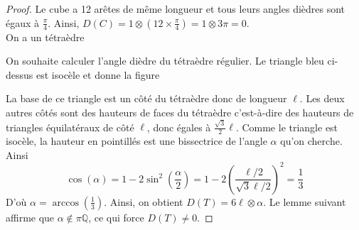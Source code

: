 \documentclass{article}
\newcommand{\Q}{\mathbb{Q}}
\theoremstyle{plain}
\theoremstyle{definition}
\theoremstyle{remark}
\begin{document}
\begin{proof}
    Le cube a 12 arêtes de même longueur et tous leurs angles dièdres sont égaux à $\frac{\pi}{4}$. Ainsi, $D(C) = 1 \otimes (12 \times \frac{\pi}{4}) = 1 \otimes 3 \pi = 0$. \\
    On a un tétraèdre
    \begin{center}
    \end{center}
    On souhaite calculer l'angle dièdre du tétraèdre régulier. Le triangle bleu ci-dessus est isocèle et donne la figure
    \begin{center}
    \end{center}
    La base de ce triangle est un côté du tétraèdre donc de longueur $\ell$. Les deux autres côtés sont des hauteurs de faces du tétraèdre c'est-à-dire des hauteurs de triangles équilatéraux de côté $\ell$, donc égales à $\frac{\sqrt{3}}{2} \ell$. Comme le triangle est isocèle, la hauteur en pointillés est une bissectrice de l'angle $\alpha$ qu'on cherche. Ainsi
    \[\cos(\alpha) = 1 - 2\sin^2\left(\frac{\alpha}{2}\right) = 1 - 2 \left(\frac{\ell/2}{\sqrt{3}\ell/2}\right)^2 = \frac{1}{3}\]
    D'où $\alpha = \arccos\left(\frac{1}{3}\right)$. Ainsi, on obtient $D(T) = 6 \ell \otimes \alpha$. Le lemme suivant affirme que $\alpha \notin \pi \Q$, ce qui force $D(T) \ne 0$.
\end{proof}
\end{document}
